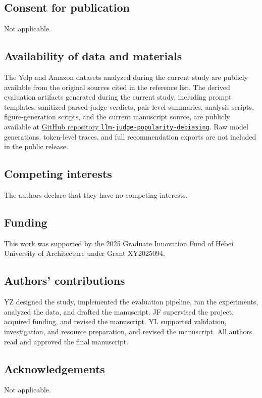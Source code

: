 \documentclass[pdflatex,sn-basic,referee,lineno]{sn-jnl}
\begin{document}
\subsection*{Consent for publication}
Not applicable.

\subsection*{Availability of data and materials}
The Yelp and Amazon datasets analyzed during the current study are publicly available from the original sources cited in the reference list. The derived evaluation artifacts generated during the current study, including prompt templates, sanitized parsed judge verdicts, pair-level summaries, analysis scripts, figure-generation scripts, and the current manuscript source, are publicly available at \href{https://github.com/niyaobuyaochibl/llm-judge-popularity-debiasing}{GitHub repository \texttt{llm-judge-popularity-debiasing}}. Raw model generations, token-level traces, and full recommendation exports are not included in the public release.

\subsection*{Competing interests}
The authors declare that they have no competing interests.

\subsection*{Funding}
This work was supported by the 2025 Graduate Innovation Fund of Hebei University of Architecture under Grant XY2025094.

\subsection*{Authors' contributions}
YZ designed the study, implemented the evaluation pipeline, ran the experiments, analyzed the data, and drafted the manuscript. JF supervised the project, acquired funding, and revised the manuscript. YL supported validation, investigation, and resource preparation, and revised the manuscript. All authors read and approved the final manuscript.

\subsection*{Acknowledgements}
Not applicable.
\end{document}
